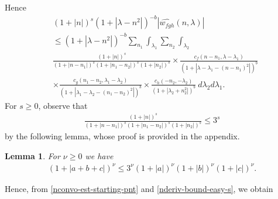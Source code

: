 \documentclass[12pt,reqno]{amsart}
\numberwithin{equation}{section}  %
\newcommand{\wh}{\widehat}
\newtheorem{lemma}[theorem]{Lemma}
\begin{document}
%
%
Hence
%
%
\begin{equation}
	\label{nconvo-est-starting-pnt}
	\begin{split}
		 & \left (1 + |n| \right )^s \left( 1 + | \lambda - n^{2} | \right)^{-b} | \wh{w_{fgh}}\left( 
		n, \lambda \right) |
		\\
		& \le \left( 1 + | \lambda - n^{2} | \right)^{-b}
    \sum_{n_{1} } \int_{\lambda_{1}} \sum_{n_{2}}
    \int_{\lambda_{2}}     \\
    & \frac{\left (1 + |n| \right )^s}{\left (1 +
		|n - n_{1}| \right )^s \left (1 + | n_1 - n_2| \right )^s \left (1 + |n_{2}| \right )^s} 
		\times \frac{c_f(n - n_{1}, \lambda - \lambda_1)}{\left( 1 + | \lambda - \lambda_1 - (n - n_{1})^{2} | 
		\right)^{b}}
		\\
		& \times
		\frac{c_g(n_1 - n_2, \lambda_1 - \lambda_2)}{\left( 1 + | \lambda_1 - \lambda_2 - (n_1 - n_2)^{2} | 
		\right)^{b}} \times
		\frac{c_h(-n_{2}, -\lambda_2)}{\left( 1 + | \lambda_2 + n_{2}^{2} | 
		\right)^{b}}\ d \lambda_2 d \lambda_1 .
	\end{split}
\end{equation}
%
%
For $s \ge 0$, observe that
%
%
\begin{equation}
	\label{nderiv-bound-easy-s}
	\begin{split}
		\frac{\left (1 + |n| \right ) ^s}{\left (1 + |n - n_{1}| \right ) ^s \left (1 + |n_1 - n_2| \right ) ^s \left (1 + |n_2| \right ) ^s} 
		\le 3^{s}
	\end{split}
\end{equation}
%
%
by the following lemma, whose proof is provided in the appendix.
%
%
\begin{lemma}
\label{nlem:splitting}
	For $\nu \ge 0$ we have
%
%
\begin{equation}
	\label{nsplitting}
	\begin{split}
    \left ( 1 + |a +b + c| \right)^{\nu} \le 3^{ \nu}
    \left(1 + | a | \right)^{\nu} \left(
    1 + | b | \right)^{\nu} \left( 1 + | c | \right)^{\nu}.
	\end{split}
\end{equation}
%
%
\end{lemma}
%
%
Hence, from \eqref{nconvo-est-starting-pnt} and \eqref{nderiv-bound-easy-s}, we 
obtain
%
\end{document}
